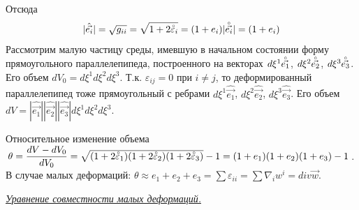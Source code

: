 Отсюда
$$ |\hat{\vec{e_i}}| = \sqrt{g_{ii}} = \sqrt{1 + 2\accentset{\circ}{\varepsilon}_{i}} = (1+e_i)|\accentset{\circ}{\vec{e_i}}| = (1+e_i)
$$
Рассмотрим малую частицу среды, имевшую в начальном состоянии форму прямоугольного параллелепипеда, построенного на векторах $d\xi^1\accentset{\circ}{\vec{e_1}}$, $d\xi^2\accentset{\circ}{\vec{e_2}}$, $d\xi^3\accentset{\circ}{\vec{e_3}}$. Его объем $dV_0 = d\xi^1d\xi^2d\xi^3$. Т.к. $\varepsilon_{ij} = 0$ при $i \not= j$, то деформированный параллелепипед тоже прямоугольный с ребрами $d\xi^1\hat{\vec{e_1}}$, $d\xi^2\hat{\vec{e_2}}$, $d\xi^3\hat{\vec{e_3}}$. Его объем $dV = |\hat{\vec{e_1}}||\hat{\vec{e_2}}||\hat{\vec{e_3}}|d\xi^1d\xi^2d\xi^3$.
\begin{figure}[H]
  \centering{}
  \label{fig4}
\end{figure}
Относительное изменение объема $\theta = \dfrac{dV - dV_{0}}{dV_{0}} = \sqrt{(1+2\accentset{\circ}{\varepsilon}_{1})(1+2\accentset{\circ}{\varepsilon}_{2})(1+2\accentset{\circ}{\varepsilon}_{3})} - 1 = (1+e_1)(1+e_2)(1+e_3) - 1$. В случае малых деформаций: $\theta \approx e_1 + e_2 + e_3 = \sum\varepsilon_{ii} = \sum\nabla_iw^i = div {\vec w}$.


\begin{center}
  \textit{\underline{Уравнение совместности малых деформаций.}}
\end{center}

